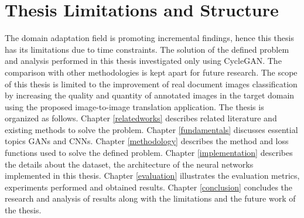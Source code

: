 \section{Thesis Limitations and Structure}\label{thesisstructurelimitations}
The domain adaptation field is promoting incremental findings, hence this thesis has its limitations due to time constraints. The solution of the defined problem and analysis performed in this thesis investigated only using \ac{CycleGAN}. The comparison with other methodologies is kept apart for future research. The scope of this thesis is limited to the improvement of real document images classification by increasing the quality and quantity of annotated images in the target domain using the proposed image-to-image translation application. The thesis is organized as follows. Chapter \ref{relatedworks} describes related literature and existing methods to solve the problem. Chapter \ref{fundamentals} discusses essential topics \acp{GAN} and \acp{CNN}. Chapter \ref{methodology} describes the method and loss functions used to solve the defined problem. Chapter \ref{implementation} describes the details about the dataset, the architecture of the neural networks implemented in this thesis. Chapter \ref{evaluation} illustrates the evaluation metrics, experiments performed and obtained results. Chapter \ref{conclusion} concludes the research and analysis of results along with the limitations and the future work of the thesis.


